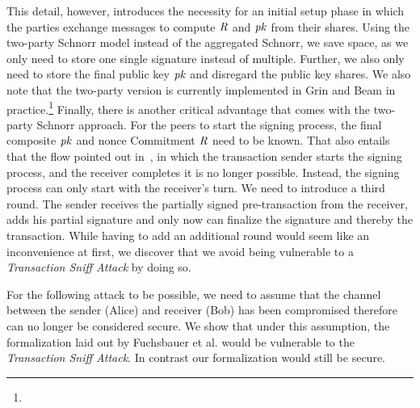 This detail, however, introduces the necessity for an initial setup phase in which the parties exchange messages to compute $\mathit{R}$ and $\mathit{pk}$ from their shares.
Using the two-party Schnorr model instead of the aggregated Schnorr, we save space, as we only need to store one single signature instead of multiple.
Further, we also only need to store the final public key $\mathit{pk}$ and disregard the public key shares.
We also note that the two-party version is currently implemented in Grin and Beam in practice.\footnote{\urlgrinexplained}
Finally, there is another critical advantage that comes with the two-party Schnorr approach.
For the peers to start the signing process, the final composite $\mathit{pk}$ and nonce Commitment $\mathit{R}$ need to be known.
That also entails that the flow pointed out in~\cite{fuchsbauer2019aggregate}, in which the transaction sender starts the signing process, and the receiver completes it is no longer possible.
Instead, the signing process can only start with the receiver's turn.
We need to introduce a third round.
The sender receives the partially signed pre-transaction from the receiver, adds his partial signature and only now can finalize the signature and thereby the transaction.
While having to add an additional round would seem like an inconvenience at first, we discover that we avoid being vulnerable to a \emph{Transaction Sniff Attack} by doing so.

For the following attack to be possible, we need to assume that the channel between the sender (Alice) and receiver (Bob) has been compromised therefore can no longer be considered secure.
We show that under this assumption, the formalization laid out by Fuchsbauer et al. would be vulnerable to the \emph{Transaction Sniff Attack}.
In contrast our formalization would still be secure.
